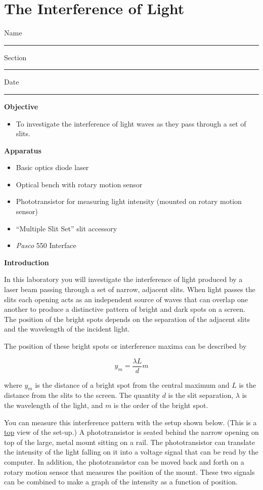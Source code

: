 
\section{The Interference of Light}

Name \rule{2.0in}{0.1pt}\hfill{}Section \rule{1.0in}{0.1pt}\hfill{}Date
\rule{1.0in}{0.1pt}

\textbf{Objective}

\begin{itemize}
\item To investigate the interference of light waves as they pass through
a set of slits. 
\end{itemize}
\textbf{Apparatus}

\begin{itemize}
\item Basic optics diode laser
\item Optical bench with rotary motion sensor
\item Phototransistor for measuring light intensity (mounted on rotary motion sensor)
\item ``Multiple Slit Set'' slit accessory
\item {\it Pasco} 550 Interface
\end{itemize}
\textbf{Introduction}

In this laboratory you will investigate the interference of light
produced by a laser beam passing through a set of narrow, adjacent
slits. When light passes the slits each opening acts as an independent
source of waves that can overlap one another to produce a distinctive
pattern of bright and dark spots on a screen. The position of the
bright spots depends on the separation of the adjacent slits and the
wavelength of the incident light. 

The position of these bright spots or interference maxima can be described by

\[
y_{m}=\frac{\lambda L}{d}m\]

where $y_{m}$ is the distance of a bright spot from the central
maximum and $L$ is
the distance from the slits to the screen. The quantity $d$
is the slit separation, \( \lambda  \) is the wavelength of the light,
and $m$ is the order of the bright spot. 

You can measure this interference pattern with the setup shown below. 
(This is a \underline{top} view of the set-up.) 
A phototransistor is seated behind the narrow opening on top of the large,
metal mount sitting on a rail. The phototransistor can translate the intensity 
of the light falling on it into a voltage signal that can be read by the
computer. In addition, the phototransistor can be moved back and
forth on a rotary motion sensor that measures the position of the 
mount. These two signals can be combined to
make a graph of the intensity as a function of position.

